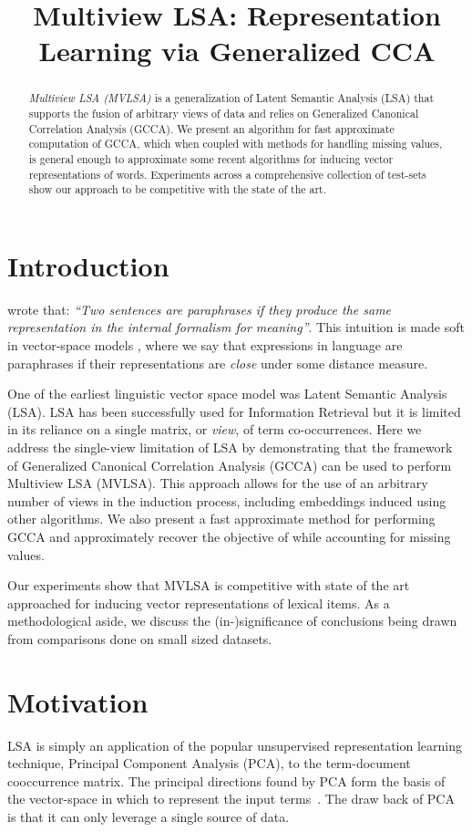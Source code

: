 \documentclass[11pt]{article}
\title{Multiview LSA: Representation Learning via Generalized CCA}
\date{}
\begin{document}
\maketitle
\begin{abstract}
  \emph{Multiview LSA (MVLSA)} is a generalization of Latent Semantic
  Analysis (LSA) that supports the  
  fusion of arbitrary views of data and relies on Generalized Canonical Correlation
  Analysis (GCCA). We present an algorithm
  for fast approximate computation of GCCA, which when coupled with methods
  for handling missing values, is general enough to approximate
  some recent algorithms for inducing vector representations of
  words. Experiments across a comprehensive 
  collection of test-sets show our approach to be competitive with the
  state of the art.   
\end{abstract}

\section{Introduction}
 wrote that: \emph{``Two sentences
  are paraphrases if they produce the same representation in the
  internal formalism for meaning''}.  This intuition is made soft in
vector-space models \cite{turney2010frequency}, where we say that
expressions in language are paraphrases if
their representations are \emph{close} under some distance measure.

One of the earliest linguistic vector space model was Latent
Semantic Analysis (LSA). LSA has been successfully used 
for Information Retrieval but it is limited in its
reliance on a single matrix, or \emph{view}, of term co-occurrences.
Here we address the single-view limitation of LSA by demonstrating
that the framework of Generalized Canonical Correlation Analysis
(GCCA) can be used to perform Multiview LSA (MVLSA). This
approach allows for the use of an arbitrary number of views in the
induction process, including embeddings induced using other
algorithms. We also present a fast approximate method for performing
GCCA and approximately recover the objective of
\cite{pennington2014glove} while accounting for missing values. 

Our experiments show that MVLSA is competitive with state of the art
approached for inducing vector representations of lexical items.
As a methodological aside, we discuss the (in-)significance of
conclusions being drawn from comparisons done on small sized datasets.

\section{Motivation} 
LSA is simply an application of the popular unsupervised representation
learning technique, Principal Component Analysis (PCA), to the
term-document cooccurrence matrix.  
The principal directions found by PCA form the basis of the
vector-space in which to represent the input
terms~\cite{landauer1997solution}. The draw back of PCA is that it can
only leverage a single source of data.    
\end{document}
